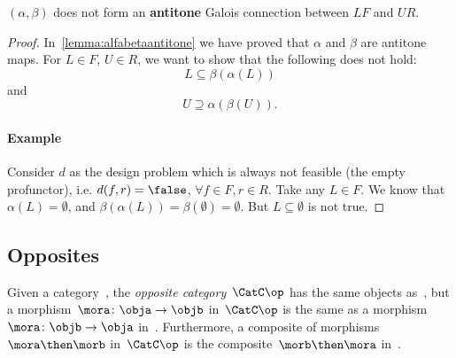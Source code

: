 

\begin{lemma}
    $(\alpha, \beta)$ does not form an \textbf{antitone} Galois connection between $LF$ and $UR$.
\end{lemma}
\begin{proof}
    In~\cref{lemma:alfabetaantitone} we have proved that $\alpha$ and $\beta$ are antitone maps. For $L\in F$, $U\in R$, we want to show that the following does not hold:
    \begin{equation}
        \label{eq:alfabetafirst}
        L\subseteq \beta(\alpha(L))
    \end{equation}
    and
    \begin{equation}
        \label{eq:alfabetasec}
        U\supseteq \alpha(\beta(U)).
    \end{equation}

    \paragraph{Example} Consider $d$ as the design problem which is always not feasible (the empty profunctor), i.e. $d(f,r)=\false$, $\forall f\in F,r\in R$. Take any $L\in F$. We know that $\alpha(L)=\emptyset$, and $\beta(\alpha(L))=\beta(\emptyset)=\emptyset$. But $L\subseteq \emptyset$ is not true.

\end{proof}

\subsection{Opposites}

\begin{ctdefinition}
    \label{def:oppositecat}
    Given a category~\CatC, the \emph{opposite category}~$\CatC\op$ has the same objects as~\CatC, but a morphism~$\mora\colon \obja\to \objb$ in~$\CatC\op$ is the same as a morphism~$\mora\colon \objb\to \obja$ in~\CatC. Furthermore, a composite of morphisms~$\mora \then \morb$ in~$\CatC\op$ is the composite~$\morb\then \mora$ in~\CatC.
\end{ctdefinition}

